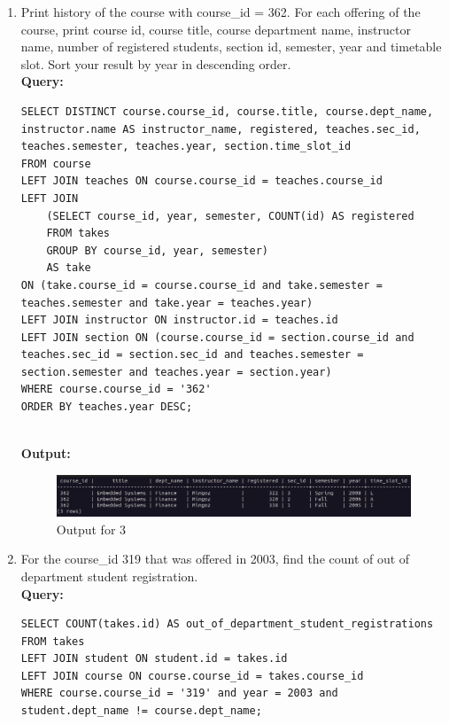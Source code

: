 \documentclass[12pt]{article}
\begin{document}
\begin{enumerate}[label=\textbf{\arabic*:}, left=0pt, labelsep=10pt, align=left, parsep=0pt, itemsep=10pt]
    \vspace{25pt}
    \item Print history of the course with course\_id = 362. For each offering of the course, print course id, 
    course title, course department name, instructor name, number of registered students, section id, 
    semester, year and timetable slot. Sort your result by year in descending order.   
    \\ \textbf{Query:}
    \begin{lstlisting}
SELECT DISTINCT course.course_id, course.title, course.dept_name, instructor.name AS instructor_name, registered, teaches.sec_id, teaches.semester, teaches.year, section.time_slot_id
FROM course
LEFT JOIN teaches ON course.course_id = teaches.course_id
LEFT JOIN 
    (SELECT course_id, year, semester, COUNT(id) AS registered
    FROM takes
    GROUP BY course_id, year, semester) 
    AS take
ON (take.course_id = course.course_id and take.semester = teaches.semester and take.year = teaches.year)
LEFT JOIN instructor ON instructor.id = teaches.id
LEFT JOIN section ON (course.course_id = section.course_id and teaches.sec_id = section.sec_id and teaches.semester = section.semester and teaches.year = section.year) 
WHERE course.course_id = '362'
ORDER BY teaches.year DESC;
    \end{lstlisting}

    \\ \textbf{Output:}
    \begin{figure}[H]
        \centering
        \includegraphics[width=1\textwidth]{images/3.png}
        \caption{Output for 3}
    \end{figure}

    \vspace{25pt}
    \item  For the course\_id 319 that was offered in 2003, find the count of out of department student registration. 
    \\ \textbf{Query:}
    \begin{lstlisting}
SELECT COUNT(takes.id) AS out_of_department_student_registrations
FROM takes
LEFT JOIN student ON student.id = takes.id
LEFT JOIN course ON course.course_id = takes.course_id
WHERE course.course_id = '319' and year = 2003 and student.dept_name != course.dept_name;
    \end{lstlisting}


\end{enumerate}
\end{document}
